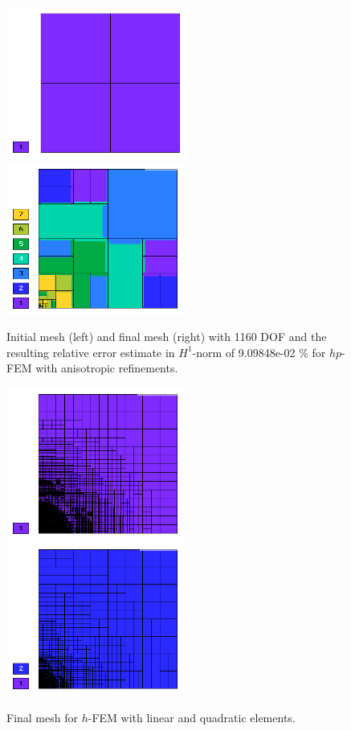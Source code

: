 \begin{figure}[!ht]
\centering
\includegraphics[height=5cm]{nist/nist-8/mesh_hp_aniso_init.png}\ \
\includegraphics[height=5cm]{nist/nist-8/mesh_hp_aniso.png}
\caption{Initial mesh (left) and final mesh (right) with 1160 DOF and the resulting relative error estimate in $H^1$-norm of 9.09848e-02 \% for $hp$-FEM with anisotropic refinements.}
\label{fig:nist-8-hp-aniso}
\end{figure}

\begin{figure}[!ht]
\centering
\includegraphics[height=5cm]{nist/nist-8/mesh_h1_aniso.png}\ \
\includegraphics[height=5cm]{nist/nist-8/mesh_h2_aniso.png}
\caption{Final mesh for $h$-FEM with linear and quadratic elements.}
\label{fig:nist-8-h-aniso}
\end{figure}


